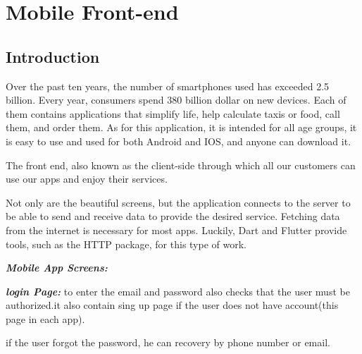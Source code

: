   
\section{Mobile Front-end}
\newline

\subsection{Introduction}
\newline
Over the past ten years, the number of smartphones used has exceeded 2.5 billion. Every year, consumers spend  380 billion dollar on new devices. Each of them contains applications that simplify life, help calculate taxis or food, call them, and order them.
As for this application, it is intended for all age groups, it is easy to use and used for both Android and IOS, and anyone can download it.\par
The front end, also known as the client-side through which all our customers can use our apps and enjoy their services.
\par \newline
Not only are the beautiful screens, but the application connects to the server to be able to send and receive data to provide the desired service.
Fetching data from the internet is necessary for most apps. Luckily, Dart and Flutter provide tools, such as the HTTP package, for this type of work. 

\textbf{\textit{Mobile App Screens:}}\par

\textbf{\textit{login Page:}}  to enter the email and password also checks that the
user must be authorized.it also contain sing up page if the user does not have account(this page in each app).\par
if the user forgot the password, he can recovery by phone number or email.

